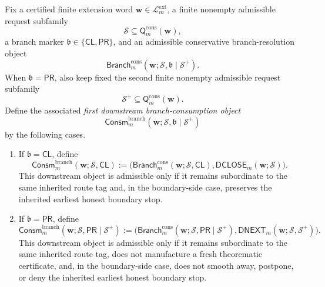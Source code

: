 \begin{definition}
\label{def:first-downstream-branch-consumption-object-second-level}
Fix a certified finite extension word \(\mathbf w\in\mathcal L^{\mathrm{ext}}_{m}\), a finite nonempty admissible request subfamily
\[
 \mathcal S \subseteq \mathsf{Q}^{\mathrm{cons}}_{m}(\mathbf w),
\]
a branch marker \(\mathfrak b\in\{\mathsf{CL},\mathsf{PR}\}\), and an admissible conservative branch-resolution object
\[
 \mathsf{Branch}^{\mathrm{cons}}_{m}(\mathbf w;\mathcal S,\mathfrak b\mid\mathcal S^{+}).
\]
When \(\mathfrak b=\mathsf{PR}\), also keep fixed the second finite nonempty admissible request subfamily
\[
 \mathcal S^{+}\subseteq \mathsf{Q}^{\mathrm{cons}}_{m}(\mathbf w).
\]
Define the associated \emph{first downstream branch-consumption object}
\[
 \mathsf{Consm}^{\mathrm{branch}}_{m}(\mathbf w;\mathcal S,\mathfrak b\mid\mathcal S^{+})
\]
by the following cases.
\begin{enumerate}[label=(\roman*)]
 \item If \(\mathfrak b=\mathsf{CL}\), define
\[
 \mathsf{Consm}^{\mathrm{branch}}_{m}(\mathbf w;\mathcal S,\mathsf{CL})
 :=
 \bigl(\mathsf{Branch}^{\mathrm{cons}}_{m}(\mathbf w;\mathcal S,\mathsf{CL}),\mathsf{DCLOSE}_{m}(\mathbf w;\mathcal S)\bigr).
\]
This downstream object is admissible only if it remains subordinate to the same inherited route tag and, in the boundary-side case, preserves the inherited earliest honest boundary stop.

 \item If \(\mathfrak b=\mathsf{PR}\), define
\[
 \mathsf{Consm}^{\mathrm{branch}}_{m}(\mathbf w;\mathcal S,\mathsf{PR}\mid\mathcal S^{+})
 :=
 \bigl(\mathsf{Branch}^{\mathrm{cons}}_{m}(\mathbf w;\mathcal S,\mathsf{PR}\mid\mathcal S^{+}),\mathsf{DNEXT}_{m}(\mathbf w;\mathcal S,\mathcal S^{+})\bigr).
\]
This downstream object is admissible only if it remains subordinate to the same inherited route tag, does not manufacture a fresh theorematic certificate, and, in the boundary-side case, does not smooth away, postpone, or deny the inherited earliest honest boundary stop.
\end{enumerate}
\end{definition}

